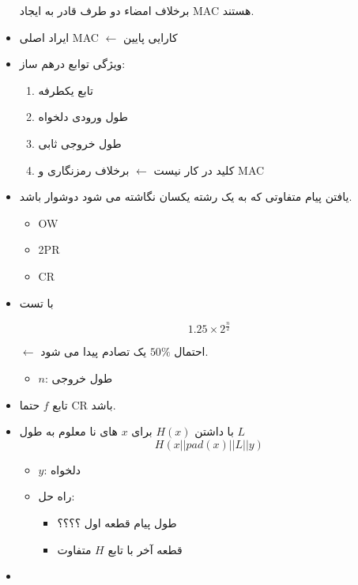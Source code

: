 \documentclass{report}
\begin{document}
\begin{itemize}
		برخلاف امضاء دو طرف قادر به ایجاد MAC هستند.
		\item 
ایراد اصلی MAC 
$\leftarrow$
 کارایی پایین
		\item 
ویژگی توابع درهم ساز:
			\begin{enumerate}
				\item 
				تابع یکطرفه
				\item 
				طول ورودی دلخواه
				\item 
				طول خروجی ثابی
				\item 
				کلید در کار نیست 
				$\leftarrow$
				برخلاف رمزنگاری و MAC
			\end{enumerate}
	
		\item 
یافتن پیام متفاوتی که به یک رشته یکسان نگاشته می شود دوشوار باشد.
			\begin{itemize}
				\item OW
				\item 2PR
				\item CR
			\end{itemize}
		\item 
با تست 

{ \large $$1.25\times2^{\frac{n}{2}}$$ }

$\leftarrow$
احتمال $50 \%$ یک تصادم پیدا می شود.
			\begin{itemize}
				\item $n$: 
				طول خروجی
			\end{itemize}
		\item 
			تابع $f$ حتما CR باشد.
		\item 
با داشتن $H(x)$ برای $x$ های نا معلوم به طول $L$
{\large $$H(x || pad(x) || L || y)$$}
			\begin{itemize}
				\item $y$:
				دلخواه
			\end{itemize}
			
			\begin{itemize}
				\item راه حل:
					\begin{itemize}
						\item
						 طول پیام قطعه اول ؟؟؟؟
						\item
						قطعه آخر با تابع $H$ متفاوت
					\end{itemize}
			\end{itemize}
	\item 


\end{itemize}
\end{document}
